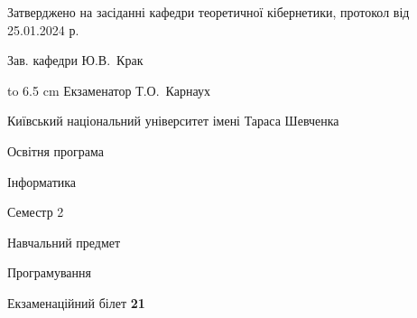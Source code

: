 \documentclass[12pt, ukrainian]{article}
\begin{document}
{\smallskip\smallskip \begin {scriptsize} Затверджено на засіданні кафедри теоретичної кібернетики, протокол   від   25.01.2024 р.\par\smallskip\smallskip\smallskip\smallskip
{\parbox {6.5 cm} {Зав. кафедри \dotfill Ю.В.~Крак}}\hspace {0.7cm} {\hbox to 6.5 cm { Екзаменатор \dotfill Т.О.~Карнаух}} \end{scriptsize}}
\newpage
{{\begin {scriptsize}\par
{ \center  Київський національний університет імені Тараса Шевченка \par}
{\parbox {5 cm}{Освітня програма \hfill}{\parbox {7 cm}{Інформатика\hfill}}\parbox {6 cm}{\hfill Семестр 2}}\par
{\parbox {5 cm} {Навчальний предмет \hfill}\parbox {7 cm}{Програмування \hfill}\parbox {6cm}{\hfill}\par}\vspace{-15pt} \end{scriptsize}}{\center Екзаменаційний білет \No \textbf { 21 }\par}}
\end{document}
